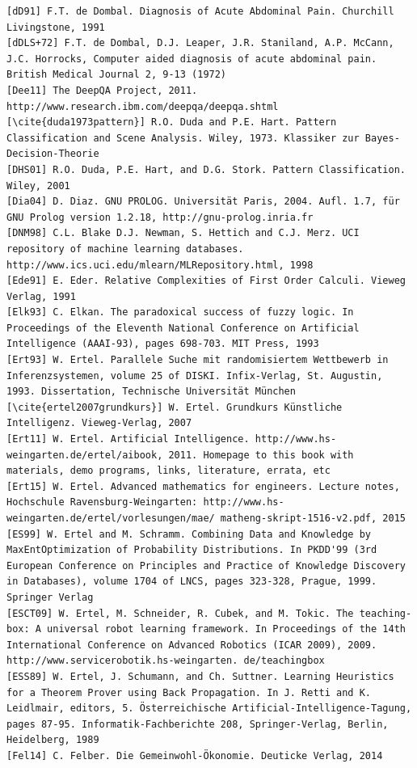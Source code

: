 \documentclass[10pt]{article}
\begin{document}
\begin{verbatim}
[dD91] F.T. de Dombal. Diagnosis of Acute Abdominal Pain. Churchill Livingstone, 1991
[dDLS+72] F.T. de Dombal, D.J. Leaper, J.R. Staniland, A.P. McCann, J.C. Horrocks, Computer aided diagnosis of acute abdominal pain. British Medical Journal 2, 9-13 (1972)
[Dee11] The DeepQA Project, 2011. http://www.research.ibm.com/deepqa/deepqa.shtml
[\cite{duda1973pattern}] R.O. Duda and P.E. Hart. Pattern Classification and Scene Analysis. Wiley, 1973. Klassiker zur Bayes-Decision-Theorie
[DHS01] R.O. Duda, P.E. Hart, and D.G. Stork. Pattern Classification. Wiley, 2001
[Dia04] D. Diaz. GNU PROLOG. Universität Paris, 2004. Aufl. 1.7, für GNU Prolog version 1.2.18, http://gnu-prolog.inria.fr
[DNM98] C.L. Blake D.J. Newman, S. Hettich and C.J. Merz. UCI repository of machine learning databases. http://www.ics.uci.edu/mlearn/MLRepository.html, 1998
[Ede91] E. Eder. Relative Complexities of First Order Calculi. Vieweg Verlag, 1991
[Elk93] C. Elkan. The paradoxical success of fuzzy logic. In Proceedings of the Eleventh National Conference on Artificial Intelligence (AAAI-93), pages 698-703. MIT Press, 1993
[Ert93] W. Ertel. Parallele Suche mit randomisiertem Wettbewerb in Inferenzsystemen, volume 25 of DISKI. Infix-Verlag, St. Augustin, 1993. Dissertation, Technische Universität München
[\cite{ertel2007grundkurs}] W. Ertel. Grundkurs Künstliche Intelligenz. Vieweg-Verlag, 2007
[Ert11] W. Ertel. Artificial Intelligence. http://www.hs-weingarten.de/ertel/aibook, 2011. Homepage to this book with materials, demo programs, links, literature, errata, etc
[Ert15] W. Ertel. Advanced mathematics for engineers. Lecture notes, Hochschule Ravensburg-Weingarten: http://www.hs-weingarten.de/ertel/vorlesungen/mae/ matheng-skript-1516-v2.pdf, 2015
[ES99] W. Ertel and M. Schramm. Combining Data and Knowledge by MaxEntOptimization of Probability Distributions. In PKDD'99 (3rd European Conference on Principles and Practice of Knowledge Discovery in Databases), volume 1704 of LNCS, pages 323-328, Prague, 1999. Springer Verlag
[ESCT09] W. Ertel, M. Schneider, R. Cubek, and M. Tokic. The teaching-box: A universal robot learning framework. In Proceedings of the 14th International Conference on Advanced Robotics (ICAR 2009), 2009. http://www.servicerobotik.hs-weingarten. de/teachingbox
[ESS89] W. Ertel, J. Schumann, and Ch. Suttner. Learning Heuristics for a Theorem Prover using Back Propagation. In J. Retti and K. Leidlmair, editors, 5. Österreichische Artificial-Intelligence-Tagung, pages 87-95. Informatik-Fachberichte 208, Springer-Verlag, Berlin, Heidelberg, 1989
[Fel14] C. Felber. Die Gemeinwohl-Ökonomie. Deuticke Verlag, 2014

\end{verbatim}
\end{document}
